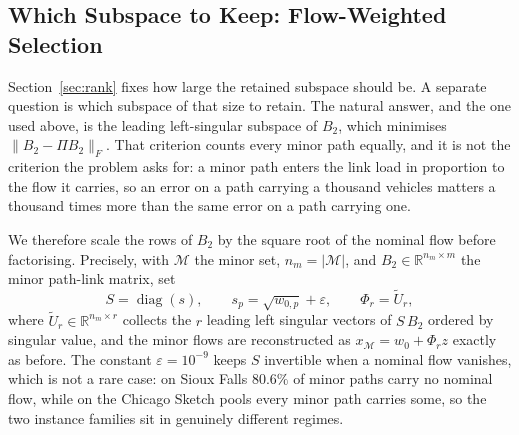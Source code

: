 \documentclass[11pt]{article}
\newif\ifshownotes \shownotesfalse
\newcommand{\conoteY}[1]{\ifshownotes{\color{red}\small\textsf{[Note to Yuchao: #1]}}\fi}
\begin{document}
\conoteY{This rule is the direct answer to Referee~2's request for analytical guidance on
$r$, and it is currently the only place we give a parameter rule. He asked the same question
about $\tau$ --- uniform or per-OD, and how it relates to convergence --- and we still choose
$\tau$ by quantile with no argument. If you can supply even a heuristic derivation for $\tau$
analogous to \eqref{eq:cost-rule}, it would close his second objection as cleanly as this
closes the first.}


\subsection{Which Subspace to Keep: Flow-Weighted Selection}
\label{sec:weighted-basis}

Section~\ref{sec:rank} fixes how large the retained subspace should be. A separate question is
which subspace of that size to retain. The natural answer, and the one used above, is the
leading left-singular subspace of $B_2$, which minimises $\|B_2 - \Pi B_2\|_F$. That criterion
counts every minor path equally, and it is not the criterion the problem asks for: a minor path
enters the link load in proportion to the flow it carries, so an error on a path carrying a
thousand vehicles matters a thousand times more than the same error on a path carrying one.

We therefore scale the rows of $B_2$ by the square root of the nominal flow before
factorising. Precisely, with $\mathcal M$ the minor set, $n_m=|\mathcal M|$, and
$B_2\in\mathbb R^{n_m\times m}$ the minor path-link matrix, set
\begin{equation}
\label{eq:weighted-basis}
S=\operatorname{diag}(s),\qquad s_p=\sqrt{w_{0,p}}+\varepsilon,\qquad
\Phi_r=\widetilde U_r,
\end{equation}
where $\widetilde U_r\in\mathbb R^{n_m\times r}$ collects the $r$ leading left singular
vectors of $S\,B_2$ ordered by singular value, and the minor flows are reconstructed as
$x_{\mathcal M}=w_0+\Phi_r z$ exactly as before. The constant $\varepsilon=10^{-9}$ keeps $S$
invertible when a nominal flow vanishes, which is not a rare case: on Sioux Falls $80.6\%$ of
minor paths carry no nominal flow, while on the Chicago Sketch pools every minor path carries
some, so the two instance families sit in genuinely different regimes.
\end{document}
